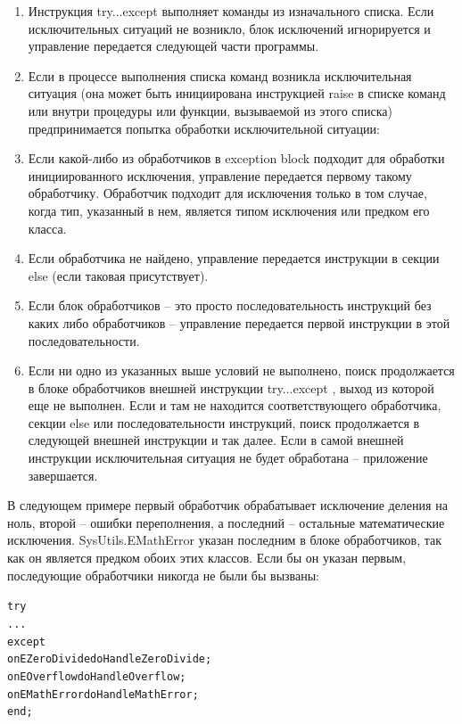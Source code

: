 \documentclass{beamer}
\begin{document}
\begin{frame}
\begin{enumerate}
\item Инструкция try...except выполняет команды из изначального списка. Если исключительных ситуаций не возникло, блок исключений игнорируется и управление передается следующей части программы.
\item Если в процессе выполнения списка команд возникла исключительная ситуация (она может быть инициирована инструкцией raise в списке команд или внутри процедуры или функции, вызываемой из этого списка) предпринимается попытка обработки исключительной ситуации:
\item Если какой-либо из обработчиков в exception block подходит для обработки инициированного исключения, управление передается первому такому обработчику. Обработчик подходит для исключения только в том случае, когда тип, указанный в нем, является типом исключения или предком его класса.
\item Если обработчика не найдено, управление передается инструкции в секции else (если таковая присутствует).
\end{enumerate}
\end{frame}

\begin{frame}
\begin{enumerate}
\setcounter{enumi}{4}
\item Если блок обработчиков – это просто последовательность инструкций без каких либо обработчиков – управление передается первой инструкции в этой последовательности.
\item Если ни одно из указанных выше условий не выполнено, поиск продолжается в блоке обработчиков внешней инструкции try...except , выход из которой еще не выполнен. Если и там не находится соответствующего обработчика, секции else или последовательности инструкций, поиск продолжается в следующей внешней инструкции и так далее. Если в самой внешней инструкции исключительная ситуация не будет обработана – приложение завершается.
\end{enumerate}
\end{frame}

\begin{frame}[fragile]
В следующем примере первый обработчик обрабатывает исключение деления на ноль, второй – ошибки переполнения, а последний – остальные математические исключения. SysUtils.EMathError указан последним в блоке обработчиков, так как он является предком обоих этих классов. Если бы он указан первым, последующие обработчики никогда не были бы вызваны:
\begin{alltt}
try
  ...
except
  on EZeroDivide do HandleZeroDivide;
  on EOverflow do HandleOverflow;
  on EMathError do HandleMathError;
end;
\end{alltt}
\end{frame}
\end{document}
